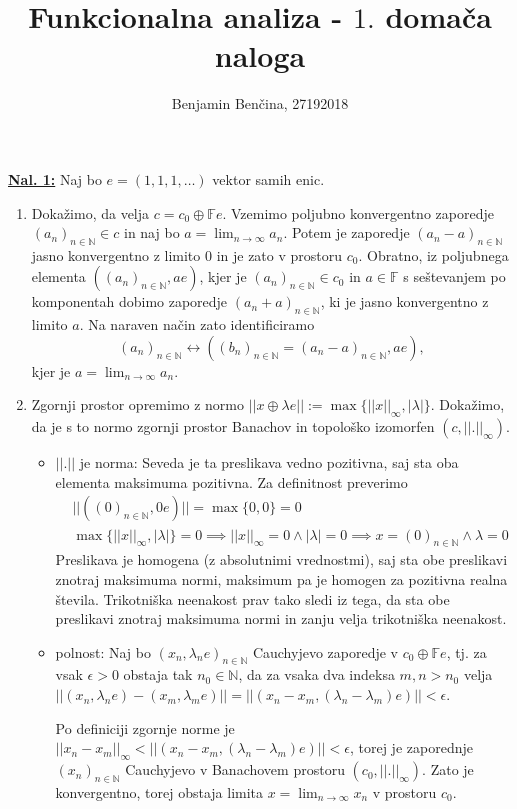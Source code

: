 \documentclass[a4paper, 12pt]{article}
\title{Funkcionalna analiza - $1.$ domača naloga}
\author{Benjamin Benčina, 27192018}
\newcommand{\N}{\mathbb{N}}
\newcommand{\F}{\mathbb{F}}
\begin{document}
\maketitle

\underline{\textbf{Nal. 1:}}
Naj bo $e = (1, 1, 1,\dots)$ vektor samih enic.
\begin{enumerate}[label=(\alph*)]
	\item Dokažimo, da velja $c = c_0 \oplus \F e$. Vzemimo poljubno konvergentno zaporedje $(a_n)_{n \in \N} \in c$ in naj bo $a = \lim_{n \to \infty}a_n$. Potem je zaporedje $(a_n - a)_{n\in\N}$ jasno konvergentno z limito $0$ in je zato v prostoru $c_0$. Obratno, iz poljubnega elementa $((a_n)_{n\in\N}, ae)$, kjer je $(a_n)_{n\in\N} \in c_0$ in $a \in \F$ s seštevanjem po komponentah dobimo zaporedje $(a_n + a)_{n\in\N}$, ki je jasno konvergentno z limito $a$. Na naraven način zato identificiramo
	\[
	(a_n)_{n\in\N} \leftrightarrow ((b_n)_{n\in\N} = (a_n - a)_{n\in\N}, ae),
	\]
	kjer je $a = \lim_{n\to\infty}a_n$.
	\item Zgornji prostor opremimo z normo $||x \oplus \lambda e|| := \max\lbrace||x||_\infty, |\lambda|\rbrace$. Dokažimo, da je s to normo zgornji prostor Banachov in topološko izomorfen $(c, ||.||_\infty)$.
	\begin{itemize}
		\item $||.||$ je norma:
		Seveda je ta preslikava vedno pozitivna, saj sta oba elementa maksimuma pozitivna. Za definitnost preverimo
		\begin{align*}
		&||((0)_{n\in\N}, 0e)|| = \max\lbrace 0, 0\rbrace = 0 \\
		&\max\lbrace ||x||_\infty, |\lambda|\rbrace = 0 \implies ||x||_\infty = 0 \land |\lambda| = 0 \implies x = (0)_{n\in\N} \land \lambda = 0
		\end{align*}
		Preslikava je homogena (z absolutnimi vrednostmi), saj sta obe preslikavi znotraj maksimuma normi, maksimum pa je homogen za pozitivna realna števila. Trikotniška neenakost prav tako sledi iz tega, da sta obe preslikavi znotraj maksimuma normi in zanju velja trikotniška neenakost.
		\item polnost:
		Naj bo $(x_n, \lambda_n e)_{n\in\N}$ Cauchyjevo zaporedje v $c_0 \oplus \F e$, tj. za vsak $\epsilon > 0$ obstaja tak $n_0 \in \N$, da za vsaka dva indeksa $m,n > n_0$ velja $||(x_n, \lambda_n e) - (x_m, \lambda_m e)|| = ||(x_n - x_m, (\lambda_n-\lambda_m)e)|| < \epsilon$.
		
		Po definiciji zgornje norme je $||x_n - x_m||_\infty < ||(x_n - x_m, (\lambda_n-\lambda_m)e)|| < \epsilon$,
		torej je zaporednje $(x_n)_{n\in\N}$ Cauchyjevo v Banachovem prostoru $(c_0, ||.||_\infty)$. Zato je konvergentno, torej obstaja limita $x = \lim_{n \to \infty} x_n$ v prostoru $c_0$.
		

\end{itemize}
\end{enumerate}
\end{document}
